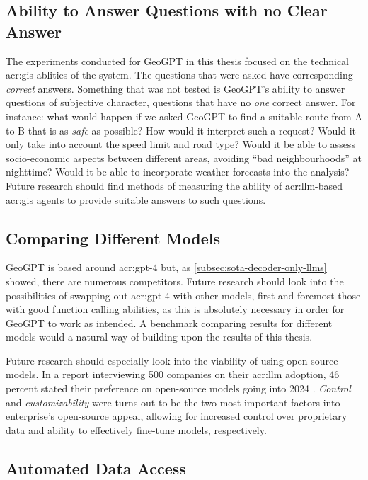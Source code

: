 \subsection{Ability to Answer Questions with no Clear Answer}

The experiments conducted for GeoGPT in this thesis focused on the technical \acrshort{acr:gis} ablities of the system. The questions that were asked have corresponding \textit{correct} answers. Something that was not tested is GeoGPT's ability to answer questions of subjective character, questions that have no \textit{one} correct answer. For instance: what would happen if we asked GeoGPT to find a suitable route from A to B that is as \textit{safe} as possible? How would it interpret such a request? Would it only take into account the speed limit and road type? Would it be able to assess socio-economic aspects between different areas, avoiding \enquote{bad neighbourhoods} at nighttime? Would it be able to incorporate weather forecasts into the analysis? Future research should find methods of measuring the ability of \acrshort{acr:llm}-based \acrshort{acr:gis} agents to provide suitable answers to such questions.

\subsection{Comparing Different Models}

GeoGPT is based around \acrshort{acr:gpt}-4 but, as \autoref{subsec:sota-decoder-only-llms} showed, there are numerous competitors. Future research should look into the possibilities of swapping out \acrshort{acr:gpt}-4 with other models, first and foremost those with good function calling abilities, as this is absolutely necessary in order for GeoGPT to work as intended. A benchmark comparing results for different models would a natural way of building upon the results of this thesis.

Future research should especially look into the viability of using open-source models. In a report interviewing 500 companies on their \acrshort{acr:llm} adoption, 46 percent stated their preference on open-source models going into 2024 \citep{wangsarah16ChangesWay2024}. \textit{Control} and \textit{customizability} were turns out to be the two most important factors into enterprise's open-source appeal, allowing for increased control over proprietary data and ability to effectively fine-tune models, respectively.

\subsection{Automated Data Access}

